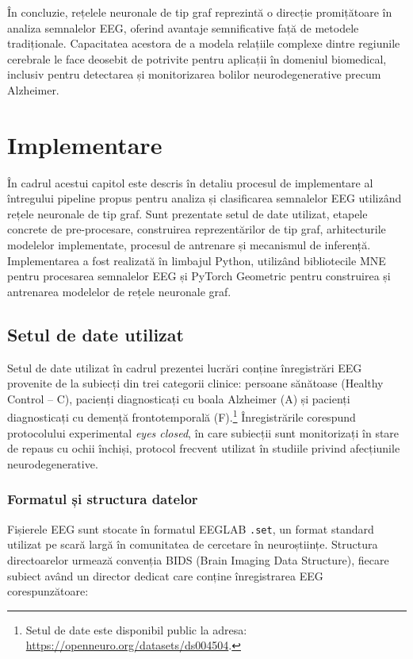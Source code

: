 \documentclass[12pt,a4paper]{report}
\theoremstyle{definition}
\theoremstyle{remark}
\begin{document}
În concluzie, rețelele neuronale de tip graf reprezintă o direcție promițătoare în analiza semnalelor EEG, oferind avantaje semnificative față de metodele tradiționale. Capacitatea acestora de a modela relațiile complexe dintre regiunile cerebrale le face deosebit de potrivite pentru aplicații în domeniul biomedical, inclusiv pentru detectarea și monitorizarea bolilor neurodegenerative precum Alzheimer. 

\chapter{Implementare}

În cadrul acestui capitol este descris în detaliu procesul de implementare al întregului pipeline propus pentru analiza și clasificarea semnalelor EEG utilizând rețele neuronale de tip graf. Sunt prezentate setul de date utilizat, etapele concrete de pre-procesare, construirea reprezentărilor de tip graf, arhitecturile modelelor implementate, procesul de antrenare și mecanismul de inferență. Implementarea a fost realizată în limbajul Python, utilizând bibliotecile MNE \cite{gramfort2013mne} pentru procesarea semnalelor EEG și PyTorch Geometric \cite{fey2019fast} pentru construirea și antrenarea modelelor de rețele neuronale graf.

\section{Setul de date utilizat}

Setul de date utilizat în cadrul prezentei lucrări conține înregistrări EEG provenite de la subiecți din trei categorii clinice: persoane sănătoase (Healthy Control -- C), pacienți diagnosticați cu boala Alzheimer (A) și pacienți diagnosticați cu demență frontotemporală (F).\footnote{Setul de date este disponibil public la adresa: \url{https://openneuro.org/datasets/ds004504}.} Înregistrările corespund protocolului experimental \textit{eyes closed}, în care subiecții sunt monitorizați în stare de repaus cu ochii închiși, protocol frecvent utilizat în studiile privind afecțiunile neurodegenerative.

\subsection{Formatul și structura datelor}
\label{sec:format_date}

Fișierele EEG sunt stocate în formatul EEGLAB \texttt{.set}, un format standard utilizat pe scară largă în comunitatea de cercetare în neuroștiințe. Structura directoarelor urmează convenția BIDS (Brain Imaging Data Structure), fiecare subiect având un director dedicat care conține înregistrarea EEG corespunzătoare:
\end{document}
